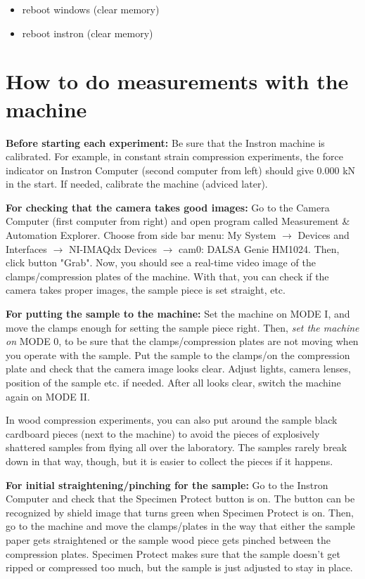 \documentclass[a4paper]{article}
\begin{document}
\begin{itemize}
	\item reboot windows (clear memory)
  \item reboot instron (clear memory)
\end{itemize}

\section{How to do measurements with the machine}

\textbf{Before starting each experiment:} Be sure that the Instron machine is calibrated. For example, in constant strain compression experiments, the force indicator on Instron Computer (second computer from left) should give 0.000 kN in the start. If needed, calibrate the machine (adviced later).

\textbf{For checking that the camera takes good images:} Go to the Camera Computer (first computer from right) and open program called Measurement \& Automation Explorer. Choose from side bar menu: My System $\rightarrow$ Devices and Interfaces $\rightarrow$ NI-IMAQdx Devices $\rightarrow$ cam0: DALSA Genie HM1024. Then, click button "Grab". Now, you should see a real-time video image of the clamps/compression plates of the machine. With that, you can check if the camera takes proper images, the sample piece is set straight, etc.

\textbf{For putting the sample to the machine:} Set the machine on \textsf{MODE I}, and move the clamps enough for setting the sample piece right. Then, \emph{set the machine on} \textsf{MODE 0}, to be sure that the clamps/compression plates are not moving when you operate with the sample. Put the sample to the clamps/on the compression plate and check that the camera image looks clear. Adjust lights, camera lenses, position of the sample etc. if needed. After all looks clear, switch the machine again on \textsf{MODE II}. 

In wood compression experiments, you can also put around the sample black cardboard pieces (next to the machine) to avoid the pieces of explosively shattered samples from flying all over the laboratory. The samples rarely break down in that way, though, but it is easier to collect the pieces if it happens.

\textbf{For initial straightening/pinching for the sample:} Go to the Instron Computer and check that the Specimen Protect button is on. The button can be recognized by shield image that turns green when Specimen Protect is on. Then, go to the machine and move the clamps/plates in the way that either the sample paper gets straightened or the sample wood piece gets pinched between the compression plates. Specimen Protect makes sure that the sample doesn't get ripped or compressed too much, but the sample is just adjusted to stay in place.
\end{document}

